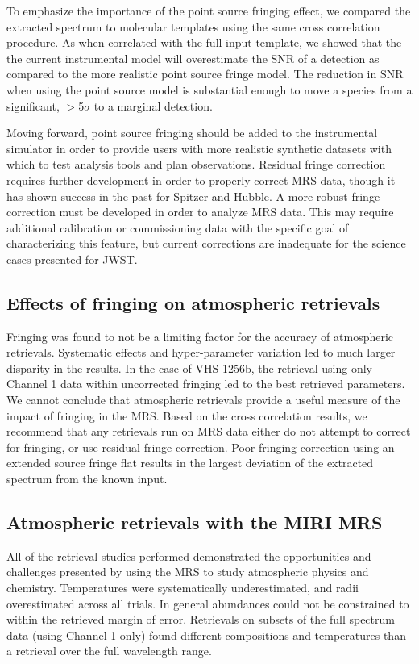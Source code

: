 To emphasize the importance of the point source fringing effect, we compared the extracted spectrum to molecular templates using the same cross correlation procedure.
As when correlated with the full input template, we showed that the the current instrumental model will overestimate the SNR of a detection as compared to the more realistic point source fringe model. 
The reduction in SNR when using the point source model is substantial enough to move a species from a significant, $>$5$\sigma$ to a marginal detection.

Moving forward, point source fringing should be added to the instrumental simulator in order to provide users with more realistic synthetic datasets with which to test analysis tools and plan observations. 
Residual fringe correction requires further development in order to properly correct MRS data, though it has shown success in the past for Spitzer and Hubble.
A more robust fringe correction must be developed in order to analyze MRS data.
This may require additional calibration or commissioning data with the specific goal of characterizing this feature, but current corrections are inadequate for the science cases presented for JWST.

\subsection{Effects of fringing on atmospheric retrievals}
Fringing was found to not be a limiting factor for the accuracy of atmospheric retrievals.
Systematic effects and hyper-parameter variation led to much larger disparity in the results.
In the case of VHS-1256b, the retrieval using only Channel 1 data within uncorrected fringing led to the best retrieved parameters.
We cannot conclude that atmospheric retrievals provide a useful measure of the impact of fringing in the MRS.
Based on the cross correlation results, we recommend that any retrievals run on MRS data either do not attempt to correct for fringing, or use residual fringe correction.
Poor fringing correction using an extended source fringe flat results in the largest deviation of the extracted spectrum from the known input.

\subsection{Atmospheric retrievals with the MIRI MRS}
All of the retrieval studies performed demonstrated the opportunities and challenges presented by using the MRS to study atmospheric physics and chemistry.
Temperatures were systematically underestimated, and radii overestimated across all trials.
In general abundances could not be constrained to within the retrieved margin of error.
Retrievals on subsets of the full spectrum data (using Channel 1 only) found different compositions and temperatures than a retrieval over the full wavelength range.

